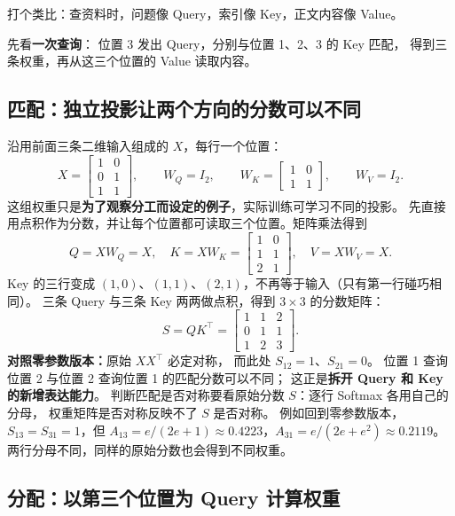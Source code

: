 打个类比：查资料时，问题像 Query，索引像 Key，正文内容像 Value。

先看\textbf{一次查询}：
位置 3 发出 Query，分别与位置 1、2、3 的 Key 匹配，
得到三条权重，再从这三个位置的 Value 读取内容。

\subsection{匹配：独立投影让两个方向的分数可以不同}

沿用前面三条二维输入组成的 $X$，每行一个位置：
\[
X=\begin{bmatrix}1&0\\0&1\\1&1\end{bmatrix},\qquad
W_Q=I_2,\qquad
W_K=\begin{bmatrix}1&0\\1&1\end{bmatrix},\qquad W_V=I_2.
\]
这组权重只是\textbf{为了观察分工而设定的例子}，实际训练可学习不同的投影。
先直接用点积作为分数，并让每个位置都可读取三个位置。矩阵乘法得到
\[
Q=XW_Q=X,\quad
K=XW_K=\begin{bmatrix}1&0\\1&1\\2&1\end{bmatrix},\quad
V=XW_V=X.
\]
Key 的三行变成 $(1,0)$、$(1,1)$、$(2,1)$，不再等于输入（只有第一行碰巧相同）。
三条 Query 与三条 Key 两两做点积，得到 $3\times3$ 的分数矩阵：
\begin{equation}
S=QK^\top
=\boxed{\begin{bmatrix}1&1&2\\0&1&1\\1&2&3\end{bmatrix}}.
\label{eq:asymmetric-qk-example}
\end{equation}
\textbf{对照零参数版本：}原始 $XX^\top$ 必定对称，
而此处 $S_{12}=\boxed{1}$、$S_{21}=\boxed{0}$。
位置 1 查询位置 2 与位置 2 查询位置 1 的匹配分数可以不同；
这正是\textbf{拆开 Query 和 Key 的新增表达能力}。
判断匹配是否对称要看原始分数 $S$：逐行 Softmax 各用自己的分母，
权重矩阵是否对称反映不了 $S$ 是否对称。
例如回到零参数版本，$S_{13}=S_{31}=1$，但
$A_{13}=e/(2e+1)\approx0.4223$，$A_{31}=e/(2e+e^2)\approx0.2119$。
两行分母不同，同样的原始分数也会得到不同权重。

\subsection{分配：以第三个位置为 Query 计算权重}

